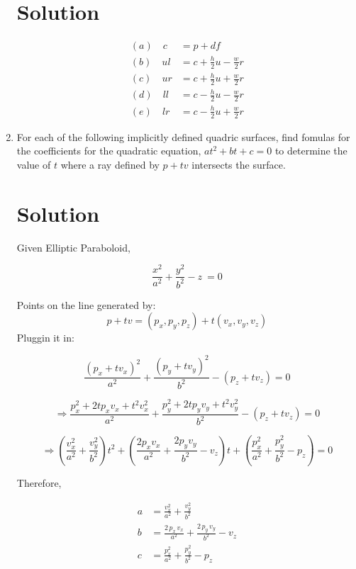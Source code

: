 \documentclass{article}
\begin{document}
\begin{enumerate}
  \section*{Solution}
\begin{align*}
(a) \quad c &= p + d f \\
(b) \quad ul &= c + \frac{h}{2} u- \frac{w}{2} r  \\
(c) \quad ur &= c + \frac{h}{2} u+ \frac{w}{2} r  \\
(d) \quad ll &= c - \frac{h}{2} u - \frac{w}{2} r \\
(e) \quad lr &= c - \frac{h}{2} u+ \frac{w}{2} r 
\end{align*}

  
\newpage

\item For each of the following implicitly defined quadric surfaces,
  find fomulas for  the coefficients  for the quadratic equation,
  $at^2 + bt + c = 0$
  to determine the value of $t$ where a ray defined by $p + tv$
  intersects the surface. 
    
    \section*{Solution}
    Given Elliptic Paraboloid,
    
    \[\frac{x^2}{a^2} + \frac{y^2}{b^2} - z\ = 0\]
\vspace{0.5cm}

    Points on the line generated by:
    \[
    p + t v = (p_x, p_y, p_z) + t (v_x, v_y, v_z)
    \]
    Pluggin it in:

    \[
    \frac{(p_x + t v_x)^2}{a^2} + \frac{(p_y + t v_y)^2}{b^2} - (p_z + t v_z) = 0
    \]

    \[
    \Rightarrow \frac{p_x^2 + 2t p_x v_x + t^2 v_x^2}{a^2} + \frac{p_y^2 + 2t p_y v_y + t^2 v_y^2}{b^2} - (p_z + t v_z) = 0
    \]

    \[
    \Rightarrow \left( \frac{v_x^2}{a^2} + \frac{v_y^2}{b^2} \right)t^2 + \left( \frac{2 p_x v_x}{a^2} + \frac{2 p_y v_y}{b^2} - v_z \right)t + \left( \frac{p_x^2}{a^2} + \frac{p_y^2}{b^2} - p_z \right) = 0
    \]

    Therefore,

    \[
\boxed{
\begin{aligned}
a &= \frac{v_x^2}{a^2} + \frac{v_y^2}{b^2}\\[1mm]
b &= \frac{2\,p_x\,v_x}{a^2} + \frac{2\,p_y\,v_y}{b^2} - v_z\\[1mm]
c &= \frac{p_x^2}{a^2} + \frac{p_y^2}{b^2} - p_z
\end{aligned}
}
\]
\vspace{1cm}


\end{enumerate}
\end{document}
